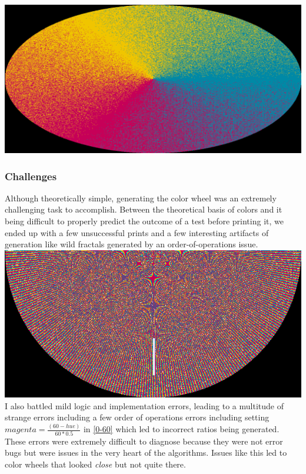 \documentclass{article}
\begin{document}
\begin{multicols}{2}
\noindent
\includegraphics[width=\columnwidth]{color-wheel-scaled}

\subsubsection{Challenges}

Although theoretically simple, generating the color wheel was an extremely challenging task to accomplish. Between the theoretical basis of colors and it being difficult to properly predict the outcome of a test before printing it, we ended up with a few unsuccessful prints and a few interesting artifacts of generation like wild fractals generated by an order-of-operations issue.
\\

\noindent
\includegraphics[width=\columnwidth]{artifact}
\\

\noindent
I also battled mild logic and implementation errors, leading to a multitude of strange errors including a few order of operations errors including setting $magenta=\frac{(60-hue)}{60 * 0.5}$ in \ref{0-60} which led to incorrect ratios being generated. These errors were extremely difficult to diagnose because they were not error bugs but were issues in the very heart of the algorithms. Issues like this led to color wheels that looked \textit{close} but not quite there.


\end{multicols}
\end{document}
